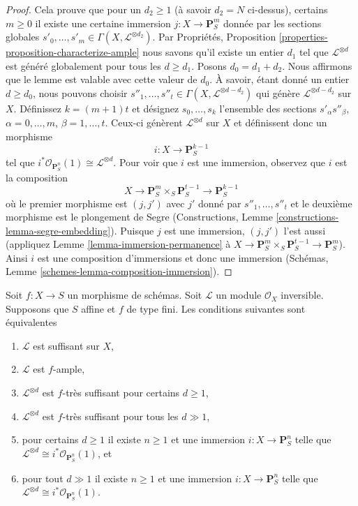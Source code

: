 \begin{proof}
\medskip\noindent
Cela prouve que pour un $d_2 \geq 1$
(à savoir $d_2 = N$ ci-dessus), certains
$m \geq 0$ il existe une certaine immersion $j : X \to \mathbf{P}^m_S$
donnée par les sections globales $s'_0, \ldots, s'_m \in \Gamma(X, \mathcal{L}^{\otimes d_2})$. Par
Propriétés, Proposition \ref{properties-proposition-characterize-ample} nous savons qu'il existe
un entier $d_1$ tel
que $\mathcal{L}^{\otimes d}$ est généré globalement pour tous les
$d \geq d_1$. Posons $d_0 = d_1 + d_2$. Nous affirmons que
le lemme est valable avec cette valeur de $d_0$. À savoir, étant donné un entier $d \geq d_0$,
nous pouvons choisir $s''_1, \ldots, s''_t
\in \Gamma(X, \mathcal{L}^{\otimes d - d_2})$ qui génère
$\mathcal{L}^{\otimes d - d_2}$ sur $X$. Définissez $k = (m + 1)t$ et
désignez $s_0, \ldots, s_k$ l'ensemble des sections
$s'_\alpha s''_\beta$, $\alpha = 0, \ldots, m$, $\beta = 1, \ldots, t$.
Ceux-ci génèrent $\mathcal{L}^{\otimes d}$ sur $X$ et
définissent donc un morphisme
$$
i : X \longrightarrow \mathbf{P}^{k - 1}_S
$$
tel que $i^*\mathcal{O}_{\mathbf{P}^n_S}(1) \cong \mathcal{L}^{\otimes d}$. Pour voir que $i$ est une immersion,
observez que $i$ est la composition
$$
X \longrightarrow \mathbf{P}^m_S \times_S \mathbf{P}^{t - 1}_S
\longrightarrow \mathbf{P}^{k - 1}_S
$$
où le premier morphisme est $(j, j')$ avec
$j'$ donné par $s''_1, \ldots, s''_t$
et le deuxième morphisme
est le plongement de Segre (Constructions, Lemme
\ref{constructions-lemma-segre-embedding}). Puisque $j$
est une immersion, $(j, j')$ l'est
aussi (appliquez Lemme \ref{lemma-immersion-permanence} à $X \to \mathbf{P}^m_S \times_S \mathbf{P}^{t - 1}_S
\to \mathbf{P}^m_S$).
Ainsi $i$ est une composition d'immersions et donc
une immersion (Schémas, Lemme \ref{schemes-lemma-composition-immersion}).
\end{proof}

\begin{lemma}
\label{lemma-finite-type-over-affine-ample-very-ample}
Soit $f : X \to S$ un morphisme de schémas. Soit $\mathcal{L}$
un module $\mathcal{O}_X$ inversible. Supposons que $S$
affine et $f$ de type fini. Les conditions
suivantes sont équivalentes
\begin{enumerate}
\item $\mathcal{L}$ est suffisant sur $X$,
\item $\mathcal{L}$ est $f$-ample,
\item $\mathcal{L}^{\otimes d}$ est $f$-très suffisant pour certains $d \geq 1$,
\item $\mathcal{L}^{\otimes d}$ est $f$-très suffisant pour tous les $d \gg 1$,
\item pour certains $d \geq 1$ il existe
$n \geq 1$ et une immersion
$i : X \to \mathbf{P}^n_S$ telle que $\mathcal{L}^{\otimes d} \cong i^*\mathcal{O}_{\mathbf{P}^n_S}(1)$, et
\item pour tout $d \gg 1$ il existe $n \geq 1$
et une immersion
$i : X \to \mathbf{P}^n_S$ telle que $\mathcal{L}^{\otimes d} \cong i^*\mathcal{O}_{\mathbf{P}^n_S}(1)$.
\end{enumerate}
\end{lemma}

